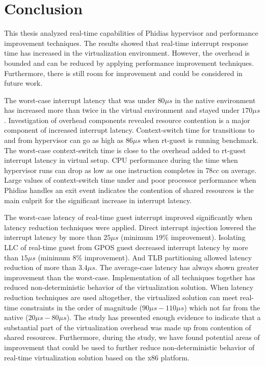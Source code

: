 \chapter{Conclusion\label{chap6}}

This thesis analyzed real-time capabilities of Phidias hypervisor and performance improvement techniques.
The results showed that real-time interrupt response time has increased in the virtualization environment.
However, the overhead is bounded and can be reduced by applying performance improvement techniques.
Furthermore, there is still room for improvement and could be considered in future work.

The worst-case interrupt latency that was under $80\mu{}s$ in the native environment has increased 
more than twice in the virtual environment and stayed under $170\mu{}s$.
Investigation of overhead components revealed resource contention is a major component of increased interrupt latency.
Context-switch time for transitions to and from hypervisor can go as high as $86\mu{}s$ when rt-guest is running \mcachepressure{} benchmark.
The worst-case context-switch time is close to the overhead added to rt-guest interrupt latency in virtual setup.
CPU performance during the time when hypervisor runs can drop as low as one instruction completes in $78cc$ on average.
Large values of context-switch time under \mcachepressure{} and poor processor performance when Phidias handles an exit event indicates 
the contention of shared resources is the main culprit for the significant increase in interrupt latency.

The worst-case latency of real-time guest interrupt improved significantly when latency reduction techniques were applied.
Direct interrupt injection lowered the interrupt latency by more than $25\mu{}s$ (minimum $19\%$ improvement).
Isolating LLC of real-time guest from GPOS guest decreased interrupt latency by more than $15\mu{}s$ (minimum $8\%$ improvement).
And TLB partitioning allowed latency reduction of more than $3.4\mu{}s$.
The average-case latency has always shown greater improvement than the worst-case.
Implementation of all techniques together has reduced non-deterministic behavior of the virtualization solution.
When latency reduction techniques are used altogether, the virtualized solution can meet real-time constraints in the order of magnitude ($90\mu{}s-110\mu{}s$) which not far from the native ($20\mu{}s-80\mu{}s$).
The study has presented enough evidence to indicate that a substantial part of the virtualization overhead was made up from contention of shared resources.
Furthermore, during the study, we have found potential areas of improvement that could be used to further reduce non-deterministic behavior of real-time virtualization solution based on the x86 platform.


